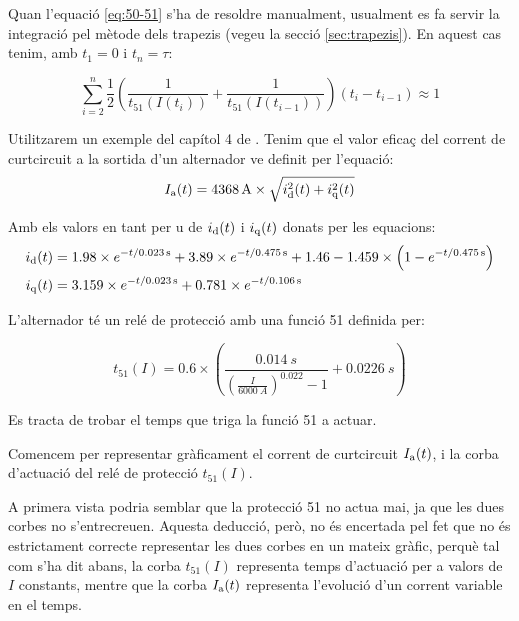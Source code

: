 Quan l'equació \eqref{eq:50-51} s'ha de resoldre manualment, usualment es fa servir la integració pel mètode dels trapezis (vegeu la secció \vref{sec:trapezis}). En aquest cas tenim, amb $t_1 = 0$ i $t_n = \tau$:

\begin{equation}\label{eq:50-51-aprox}
	\sum_{i=2}^n \frac{1}{2} \left( \frac{1}{t_{51}(I(t_i))} + \frac{1}{t_{51}(I(t_{i-1}))} \right) (t_i - t_{i-1}) \approx 1
\end{equation}


\begin{exemple}\label{ex:ProtInvIntVar}
	\addcontentsxms{\ProtInvIntVar}	
	Utilitzarem un exemple del capítol 4 de \cite{REI}. Tenim que el valor eficaç del corrent de curtcircuit a la sortida d'un alternador ve definit per l'equació:
	\[
	I_\mathrm{a}(t) = \qty{4368}{A} \times \sqrt{i_\mathrm{d}^2(t) + i_\mathrm{q}^2(t)}
	\]
	
	Amb els valors en tant per u de $i_\mathrm{d}(t)$ i $i_\mathrm{q}(t)$ donats per les equacions:
	\begin{align*}
		i_\mathrm{d}(t) &= \num{1,98} \times e^{-t/\qty{0,023}{s}} + \num{3,89} \times e^{-t/\qty{0,475}{s}} + \num{1,46} - \num{1,459} \times \left( 1 - e^{-t/\qty{0,475}{s}}\right) \\
		i_\mathrm{q}(t) &= 	\num{3,159} \times e^{-t/\qty{0,023}{s}} + \num{0,781} \times e^{-t/\qty{0,106}{s}}
	\end{align*}
	
	L'alternador té un relé de protecció amb una funció 51 definida per:
	
	\[
	t_{51}(I) = \num{0,6} \times \left(  \frac{\qty{0,014}{s}}{\left( \frac{I}{\qty{6000}{A}} \right) ^{\num{0,022}} -1} + \qty{0,0226}{s} \right)  
	\]
	
	Es tracta de trobar el temps que triga la funció 51 a actuar.
	
	Comencem per representar gràficament el corrent de curtcircuit $I_\mathrm{a}(t)$, i la corba d'actuació del relé de protecció $t_{51}(I)$.
	
	\begin{center}
		
	\end{center}
	
	A primera vista podria semblar que la protecció 51 no actua mai, ja que les dues corbes no s'entrecreuen. Aquesta deducció, però,  no és encertada pel fet que  no és estrictament correcte representar les dues corbes en un mateix gràfic, perquè tal com s'ha dit abans, la corba $t_{51}(I)$ representa temps d'actuació per a valors de $I$ constants, mentre que la corba $I_\mathrm{a}(t)$ representa l'evolució d'un corrent variable en el temps.
	

\end{exemple}
